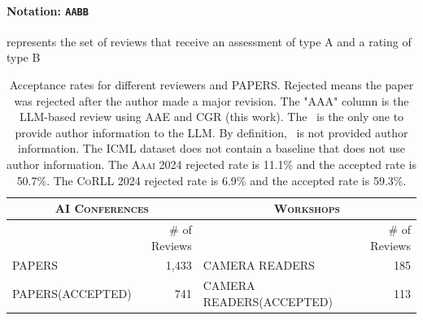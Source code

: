 \begin{minipage}[t]{\linewidth}
\paragraph{Notation: \texttt{AABB}} represents the set of reviews that receive an assessment of type A and a rating of type B
\begin{table}[t]
\centering
\caption{Number of reviews and papers}
\begin{tabular}{|l|r|l|r|} 
\hline
\multicolumn{2}{c|}{\textsc{AI Conferences}} & \multicolumn{2}{c|}{\textsc{Workshops}} \\
\hline
&\# of Reviews & &\# of Reviews  \\ \hline
PAPERS & 1,433 & CAMERA READERS & 185 \\ 
PAPERS(ACCEPTED) & 741 & CAMERA READERS(ACCEPTED) & 113 \\ \hline    
\end{tabular}
\caption{Acceptance rates for different reviewers and PAPERS. Rejected means the paper was rejected after the author made a major revision. The "AAA" column is the LLM-based review using AAE and CGR (this work). The \reviewergpt\ is the only one to provide author information to the LLM. By definition, \singlellm\ is not provided author information. The \textsc{ICML} dataset does not contain a baseline that does not use author information. The \textsc{Aaai 2024} rejected rate is 11.1\% and the accepted rate is 50.7\%. The \textsc{CoRLL 2024} rejected rate is 6.9\% and the accepted rate is 59.3\%.}
\end{table}
\end{minipage}
